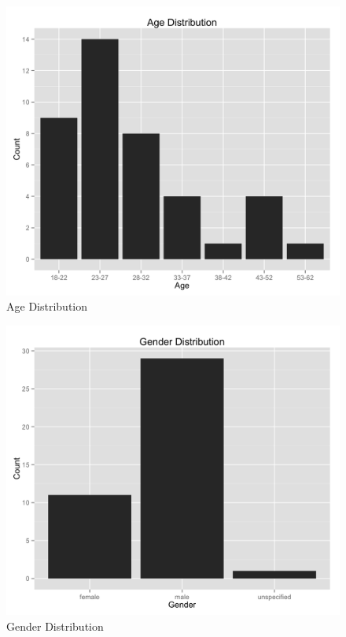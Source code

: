 \begin{figure}
    \centering
    \includegraphics[width=1.0\linewidth]{../study-2/results/graphs/age.png}
    \caption{Age Distribution}
    \label{agedistribution}
\end{figure}

\begin{figure}
    \centering
    \includegraphics[width=1.0\linewidth]{../study-2/results/graphs/gender.png}
    \caption{Gender Distribution}
    \label{genderdistribution}
\end{figure}



